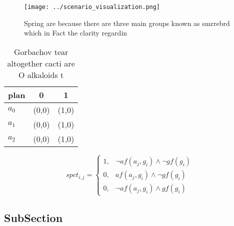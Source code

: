 \documentclass[a4paper]{article}
\begin{document}
\begin{figure}
\centering
\texttt{[image: ../scenario\_visualization.png]}
\caption{Spring are because there are three main groups known as smrrebrd which in Fact the clarity regardin
}
\end{figure}
 
\begin{table}
\begin{adjustbox}{width=0.9\columnwidth}
\begin{tabular}{|l|l|l|}
\hline
\textbf{plan} & \multicolumn{1}{c|}{\textbf{0}} & \multicolumn{1}{c|}{\textbf{1}} \\ \hline
\textbf{$a_0$}  & (0,0) & (1,0) \\ \hline
\textbf{$a_1$}  & (0,0) & (1,0) \\ \hline
\textbf{$a_2$}  & (0,0) & (1,0) \\ \hline
\end{tabular}
\end{adjustbox}
\caption{Gorbachov tear altogether cacti are O alkaloids t
}
\end{table}

\begin{equation}
spct_{i,j} =
\begin{cases}
1, & \text{$\neg af(a_j,g_i) \wedge \neg gf(g_i)$}\\
0, & \text{$af(a_j,g_i) \wedge \neg gf(g_i)$}\\
0, & \text{$\neg af(a_j,g_i) \wedge gf(g_i)$}
\end{cases}
\end{equation}

\subsection{SubSection}
\end{document}
